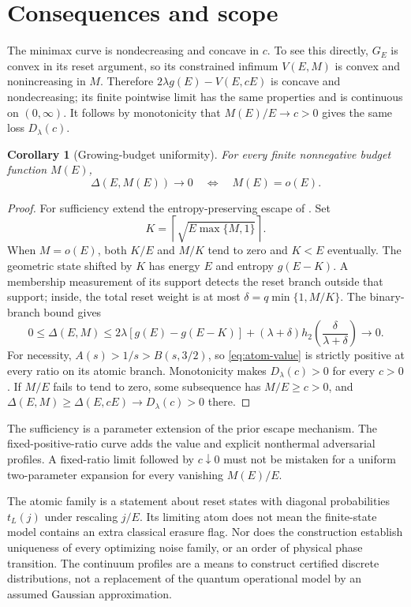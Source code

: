\documentclass[11pt]{article}
\newtheorem{corollary}[theorem]{Corollary}
\newcommand{\hbin}{h_2}
\begin{document}
\section{Consequences and scope}
The minimax curve is nondecreasing and concave in $c$. To see this directly, $G_E$ is convex in its reset argument, so its constrained infimum $V(E,M)$ is convex and nonincreasing in $M$. Therefore $2\lambda g(E)-V(E,cE)$ is concave and nondecreasing; its finite pointwise limit has the same properties and is continuous on $(0,\infty)$. It follows by monotonicity that $M(E)/E\to c>0$ gives the same loss $D_\lambda(c)$.

\begin{corollary}[Growing-budget uniformity]\label{cor:uniformity}
For every finite nonnegative budget function $M(E)$,
\[
 \Delta(E,M(E))\to0\quad\Longleftrightarrow\quad M(E)=o(E).
\]
\end{corollary}
\begin{proof}
For sufficiency extend the entropy-preserving escape of \cite{prior}. Set
\[
 K=\left\lceil\sqrt{E\max\{M,1\}}\right\rceil.
\]
When $M=o(E)$, both $K/E$ and $M/K$ tend to zero and $K<E$ eventually. The geometric state shifted by $K$ has energy $E$ and entropy $g(E-K)$. A membership measurement of its support detects the reset branch outside that support; inside, the total reset weight is at most $\delta=q\min\{1,M/K\}$. The binary-branch bound gives
\[
 0\le\Delta(E,M)\le2\lambda[g(E)-g(E-K)]
 +(\lambda+\delta)\hbin\!\left(\frac{\delta}{\lambda+\delta}\right)\to0.
\]
For necessity, $A(s)>1/s>B(s,3/2)$, so \eqref{eq:atom-value} is strictly positive at every ratio on its atomic branch. Monotonicity makes $D_\lambda(c)>0$ for every $c>0$. If $M/E$ fails to tend to zero, some subsequence has $M/E\ge c>0$, and $\Delta(E,M)\ge\Delta(E,cE)\to D_\lambda(c)>0$ there.
\end{proof}
The sufficiency is a parameter extension of the prior escape mechanism. The fixed-positive-ratio curve adds the value and explicit nonthermal adversarial profiles. A fixed-ratio limit followed by $c\downarrow0$ must not be mistaken for a uniform two-parameter expansion for every vanishing $M(E)/E$.

The atomic family is a statement about reset states with diagonal probabilities $t_L(j)$ under rescaling $j/E$. Its limiting atom does not mean the finite-state model contains an extra classical erasure flag. Nor does the construction establish uniqueness of every optimizing noise family, or an order of physical phase transition. The continuum profiles are a means to construct certified discrete distributions, not a replacement of the quantum operational model by an assumed Gaussian approximation.
\end{document}
